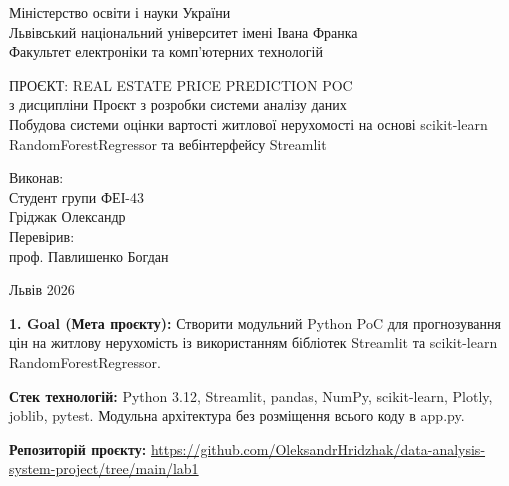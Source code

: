 \documentclass[14pt,a4paper]{extarticle}
\begin{document}
\begin{center}
Міністерство освіти і науки України\\
Львівський національний університет імені Івана Франка\\
Факультет електроніки та комп'ютерних технологій
\end{center}

\vspace{4.5cm}

\begin{center}
ПРОЄКТ: REAL ESTATE PRICE PREDICTION POC\\
з дисципліни \textquotedbl Проєкт з розробки системи аналізу даних\textquotedbl\\
\textquotedbl Побудова системи оцінки вартості житлової нерухомості на основі scikit-learn RandomForestRegressor та вебінтерфейсу Streamlit\textquotedbl
\end{center}

\vspace{3.0cm}

\begin{flushright}
Виконав:\\
Студент групи ФЕІ-43\\
Гріджак Олександр\\
Перевірив:\\
проф. Павлишенко Богдан
\end{flushright}

\vfill

\begin{center}
Львів 2026
\end{center}
\clearpage

\noindent\hspace{1.25cm}\textbf{1. Goal (Мета проєкту):} Створити модульний Python PoC для прогнозування цін на житлову нерухомість із використанням бібліотек Streamlit та scikit-learn RandomForestRegressor.

\noindent\hspace{1.25cm}\textbf{Стек технологій:} Python 3.12, Streamlit, pandas, NumPy, scikit-learn, Plotly, joblib, pytest. Модульна архітектура без розміщення всього коду в app.py.

\noindent\hspace{1.25cm}\textbf{Репозиторій проєкту:} \url{https://github.com/OleksandrHridzhak/data-analysis-system-project/tree/main/lab1}
\end{document}
